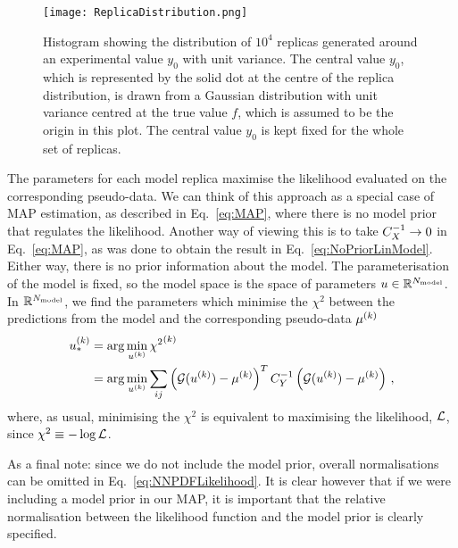 \begin{figure}
    \centering
    \texttt{[image: ReplicaDistribution.png]}
    \caption{Histogram showing the distribution of $10^4$ replicas generated
    around an experimental value $y_0$ with unit variance. The central value
    $y_0$, which is represented by the solid dot at the centre of the replica
    distribution, is drawn from a Gaussian distribution with unit variance
    centred at the true value $f$, which is assumed to be the origin in this
    plot. The central value $y_0$ is kept fixed for the whole set of
    replicas.\label{fig:DistRep}}
    \label{fig:2}       %
\end{figure}


The parameters for each model replica maximise the likelihood evaluated on the
corresponding pseudo-data. We can think of this approach as a special case of
MAP estimation, as described in Eq.~\ref{eq:MAP}, where there is no model
prior that regulates the likelihood. Another way of viewing this is to take
$C_X^{-1} \to 0$ in Eq.~\ref{eq:MAP}, as was done to obtain the
result in Eq.~\ref{eq:NoPriorLinModel}. Either way, there is no prior
information about the model. The parameterisation of the model is fixed, so the
model space is the space of parameters $u \in \mathbb{R}^{N_{\rm model}}$. In
$\mathbb{R}^{N_{\rm model}}$, we find the parameters which minimise the $\chi^2$ between
the predictions from the model and the corresponding pseudo-data
$\mu^{(k)}$
\begin{equation}\label{eq:NNPDFLikelihood}
    \begin{split}
        u_*^{(k)} &= \arg\min_{u^{(k)}} {\chi^2}^{(k)} \\
        &= \arg\min_{u^{(k)}} \sum_{ij}
        \left( \mathcal{G}(u^{(k)}) - \mu^{(k)} \right)^T
        C_{Y}^{-1}
        \left( \mathcal{G}(u^{(k)}) - \mu^{(k)} \right) \, ,
    \end{split}
\end{equation}
where, as usual, minimising the $\chi^2$ is equivalent to maximising the
likelihood, $\mathcal{L}$, since $\chi^2 \equiv -\log{\mathcal{L}}$.

As a final note: since we do not include the model prior, overall normalisations
can be omitted in Eq.~\ref{eq:NNPDFLikelihood}. It is clear however that if we
were including a model prior in our MAP, it is important that the relative
normalisation between the likelihood function and the model prior is clearly
specified.

